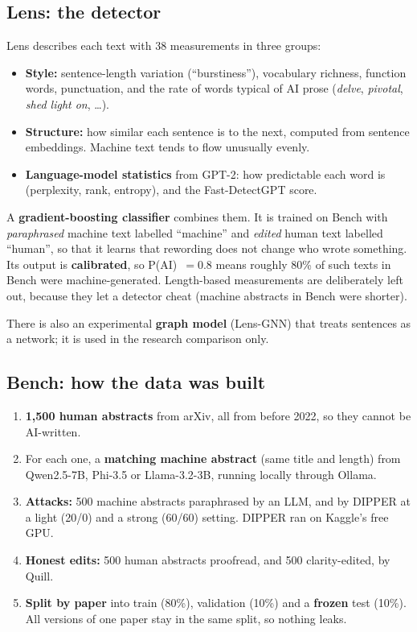 \documentclass[11pt]{article}
\begin{document}
\subsection{Lens: the detector}
Lens describes each text with 38 measurements in three groups:
\begin{itemize}
  \item \textbf{Style:} sentence-length variation (``burstiness''), vocabulary richness, function words, punctuation, and the rate of words typical of AI prose (\emph{delve}, \emph{pivotal}, \emph{shed light on}, \ldots).
  \item \textbf{Structure:} how similar each sentence is to the next, computed from sentence embeddings. Machine text tends to flow unusually evenly.
  \item \textbf{Language-model statistics} from GPT-2: how predictable each word is (perplexity, rank, entropy), and the Fast-DetectGPT score.
\end{itemize}
A \textbf{gradient-boosting classifier} combines them. It is trained on Bench with \emph{paraphrased} machine text labelled ``machine'' and \emph{edited} human text labelled ``human'', so that it learns that rewording does not change who wrote something. Its output is \textbf{calibrated}, so P(AI)~$=0.8$ means roughly 80\% of such texts in Bench were machine-generated. Length-based measurements are deliberately left out, because they let a detector cheat (machine abstracts in Bench were shorter).

There is also an experimental \textbf{graph model} (Lens-GNN) that treats sentences as a network; it is used in the research comparison only.

\subsection{Bench: how the data was built}
\begin{enumerate}
  \item \textbf{1,500 human abstracts} from arXiv, all from before 2022, so they cannot be AI-written.
  \item For each one, a \textbf{matching machine abstract} (same title and length) from Qwen2.5-7B, Phi-3.5 or Llama-3.2-3B, running locally through Ollama.
  \item \textbf{Attacks:} 500 machine abstracts paraphrased by an LLM, and by DIPPER at a light (20/0) and a strong (60/60) setting. DIPPER ran on Kaggle's free GPU.
  \item \textbf{Honest edits:} 500 human abstracts proofread, and 500 clarity-edited, by Quill.
  \item \textbf{Split by paper} into train (80\%), validation (10\%) and a \textbf{frozen} test (10\%). All versions of one paper stay in the same split, so nothing leaks.
\end{enumerate}
\end{document}
